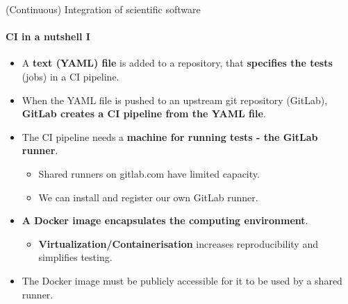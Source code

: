 \begin{frame}{(Continuous) Integration of scientific software} 
\framesubtitle{CI in a nutshell I}

    \vfill

    \begin{itemize}
        \item A \textbf{text (YAML) file} is added to a repository, that \textbf{specifies the tests} (jobs) in a CI pipeline. 

        \item When the YAML file is pushed to an upstream git repository (GitLab), \textbf{GitLab creates a CI pipeline from the YAML file}. 

        \item The CI pipeline needs a \textbf{machine for running tests - the GitLab runner}. 
            \begin{itemize}
                \item Shared runners on gitlab.com have limited capacity. 
                \item We can install and register our own GitLab runner.
            \end{itemize}
        \item \textbf{A Docker image encapsulates the computing environment}.
            \begin{itemize}
                \item \textbf{Virtualization/Containerisation} increases reproducibility and simplifies testing.
            \end{itemize}
        \item The Docker image must be publicly accessible for it to be used by a shared runner.
    \end{itemize}
\end{frame}

